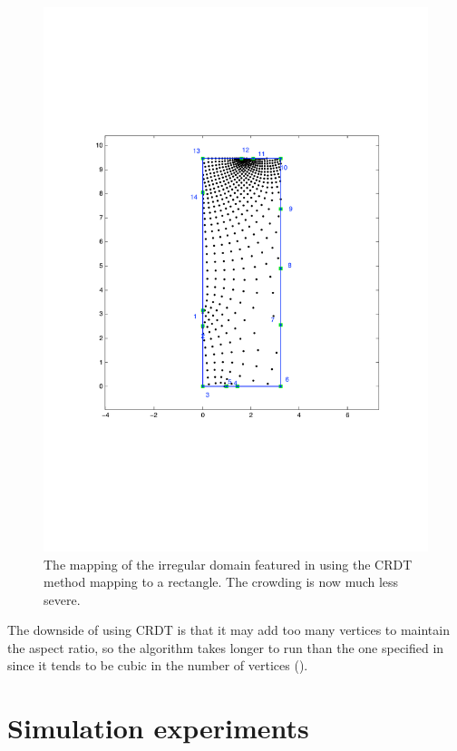 \begin{figure} [tbp]
\centering
\includegraphics[scale=0.5]{sc/figs/irregular-fixed-crdt.pdf}
\caption{The mapping of the irregular domain featured in  using the CRDT method mapping to a rectangle. The crowding is now much less severe.}
\label{uncrowdeddisk}
\end{figure}

The downside of using CRDT is that it may add too many vertices to maintain the aspect ratio, so the algorithm takes longer to run than the one specified in  since it tends to be cubic in the number of vertices (\cite{driscoll05}). 

\section{Simulation experiments}
\label{sc-sims}

